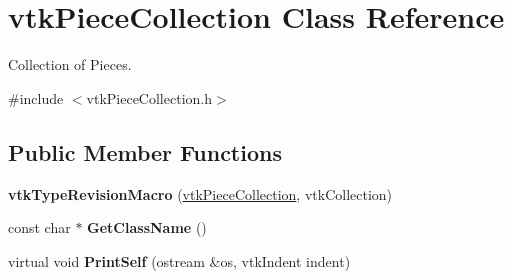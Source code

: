 \hypertarget{classvtkPieceCollection}{
\section{vtkPieceCollection Class Reference}
\label{classvtkPieceCollection}
}


Collection of Pieces.  


{\ttfamily \#include $<$vtkPieceCollection.h$>$}\subsection*{Public Member Functions}
\begin{DoxyCompactItemize}
\item 
\hypertarget{classvtkPieceCollection_a6325b41535ab86ad38c374cd0890bbec}{
{\bfseries vtkTypeRevisionMacro} (\hyperlink{classvtkPieceCollection}{vtkPieceCollection}, vtkCollection)}
\label{classvtkPieceCollection_a6325b41535ab86ad38c374cd0890bbec}

\item 
\hypertarget{classvtkPieceCollection_a6beb43592ed047683006119f367afb07}{
const char $\ast$ {\bfseries GetClassName} ()}
\label{classvtkPieceCollection_a6beb43592ed047683006119f367afb07}

\item 
\hypertarget{classvtkPieceCollection_a48b9ead9a2fc5689307603366473058c}{
virtual void {\bfseries PrintSelf} (ostream \&os, vtkIndent indent)}
\label{classvtkPieceCollection_a48b9ead9a2fc5689307603366473058c}


\end{DoxyCompactItemize}
